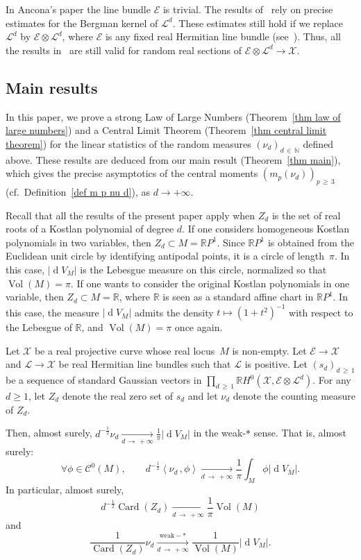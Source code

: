 \documentclass[AHL,Unicode,longabstracts,published]{cedram}
\DeclareMathOperator{\card}{Card}
\DeclareMathOperator{\dmesure}{d}
\DeclareMathOperator{\Vol}{Vol}
\newcommand{\E}{\mathcal{E}}
\newcommand{\X}{\mathcal{X}}
\renewcommand{\L}{\mathcal{L}}
\newcommand{\clC}{\mathcal{C}}
\newcommand{\N}{\mathbb{N}}
\newcommand{\R}{\mathbb{R}}
\newcommand{\norm}[1]{\left\lvert #1 \right\rvert}
\newcommand{\prsc}[2]{\left\langle #1\,, #2 \right\rangle}
\newcommand{\rmes}[1]{\norm{\dmesure\! V_{#1}}}
\newcommand{\vol}[1]{\Vol\!\left(#1\right)}
\renewcommand{\H}{H^0(\X,\E \otimes \L^d)}
\renewcommand{\geq}{\geqslant}
\let\oldforall\forall
\renewcommand*{\forall}{\mathrel{\oldforall}}
\begin{document}
\begin{rema}\label{rem line bundle E}
In Ancona's paper the line bundle $\E$ is trivial. The results of~\cite{Anc2019} rely on precise estimates for the Bergman kernel of $\L^d$. These estimates still hold if we replace $\L^d$ by $\E \otimes \L^d$, where $\E$ is any fixed real Hermitian line bundle (see~\cite[Theorem~4.2.1]{MM2007}). Thus, all the results in~\cite{Anc2019} are still valid for random real sections of $\E \otimes \L^d \to \X$.
\end{rema}


\subsection{Main results}

In this paper, we prove a strong Law of Large Numbers (Theorem~\ref{thm law of large numbers}) and a Central Limit Theorem (Theorem~\ref{thm central limit theorem}) for the linear statistics of the random measures $(\nu_d)_{d\,\in\,\N}$ defined above. These results are deduced from our main result (Theorem~\ref{thm main}), which gives the precise asymptotics of the central moments $(m_p(\nu_d))_{p\,\geq\,3}$ (cf.~Definition~\ref{def m p nu d}), as $d \to +\infty$.

Recall that all the results of the present paper apply when $Z_d$ is the set of real roots of a Kostlan polynomial of degree $d$. If one considers homogeneous Kostlan polynomials in two variables, then $Z_d \subset M = \R P^1$. Since $\R P^1$ is obtained from the Euclidean unit circle by identifying antipodal points, it is a circle of length~$\pi$. In this case, $\rmes{M}$ is the Lebesgue measure on this circle, normalized so that $\vol{M}=\pi$. If one wants to consider the original Kostlan polynomials in one variable, then $Z_d \subset M = \R$, where $\R$ is seen as a standard affine chart in $\R P^1$. In this case, the measure $\rmes{M}$ admits the density $t \mapsto (1+t^2)^{-1}$ with respect to the Lebesgue of $\R$, and $\vol{M}=\pi$ once again.

\begin{theo}\label{thm law of large numbers}
Let $\X$ be a real projective curve whose real locus~$M$ is non-empty. Let $\E \to \X$ and $\L \to \X$ be real Hermitian line bundles such that $\L$ is positive. Let $(s_d)_{d\,\geq\,1}$ be a sequence of standard Gaussian vectors in $\prod_{d\, \geq\,1}\R \H$. For any $d \geq 1$, let $Z_d$ denote the real zero set of $s_d$ and let $\nu_d$ denote the counting measure of $Z_d$.

Then, almost surely, $d^{-\frac{1}{2}}\nu_d \xrightarrow[d\,\to\,+\infty]{} \frac{1}{\pi}\rmes{M}$ in the weak-$*$ sense. That is, almost surely:
\[
\forall \phi \in \clC^0(M), \qquad d^{-\frac{1}{2}}\prsc{\nu_d}{\phi} \xrightarrow[d\,\to\,+\infty]{} \frac{1}{\pi} \int_M \phi \rmes{M}.
\]
In particular, almost surely, 
\[
d^{-\frac{1}{2}}\card(Z_d) \xrightarrow[d\,\to\,+\infty]{} \frac{1}{\pi}\vol{M} 
\]
and
\[
\frac{1}{\card(Z_d)}\nu_d \xrightarrow[d \,\to\,+\infty]{\text{weak}-*} \frac{1}{\Vol(M)}\rmes{M}.
\]
\end{theo}
\end{document}
